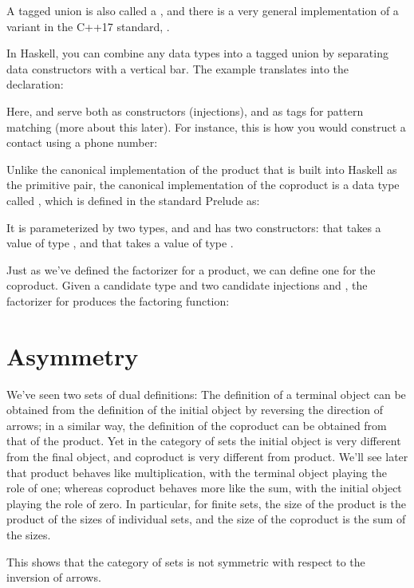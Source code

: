 A tagged union is also called a , and there is a very
general implementation of a variant in the C++17 standard,
.

In Haskell, you can combine any data types into a tagged union by
separating data constructors with a vertical bar. The 
example translates into the declaration:

Here,  and  serve both as
constructors (injections), and as tags for pattern matching (more about
this later). For instance, this is how you would construct a contact
using a phone number:

Unlike the canonical implementation of the product that is built into
Haskell as the primitive pair, the canonical implementation of the
coproduct is a data type called , which is defined in the
standard Prelude as:

It is parameterized by two types,  and  and has two
constructors:  that takes a value of type , and
 that takes a value of type .

Just as we've defined the factorizer for a product, we can define one
for the coproduct. Given a candidate type  and two candidate
injections  and , the factorizer for 
produces the factoring function:


\section{Asymmetry}

We've seen two sets of dual definitions: The definition of a terminal
object can be obtained from the definition of the initial object by
reversing the direction of arrows; in a similar way, the definition of
the coproduct can be obtained from that of the product. Yet in the
category of sets the initial object is very different from the final
object, and coproduct is very different from product. We'll see later
that product behaves like multiplication, with the terminal object
playing the role of one; whereas coproduct behaves more like the sum,
with the initial object playing the role of zero. In particular, for
finite sets, the size of the product is the product of the sizes of
individual sets, and the size of the coproduct is the sum of the sizes.

This shows that the category of sets is not symmetric with respect to
the inversion of arrows.

